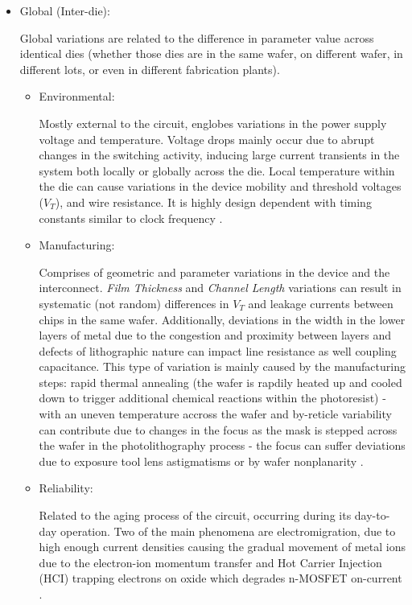 \documentclass[pgmicro,mestrado,english]{iiufrgs}
\begin{document}
\begin{itemize}

	\item Global (Inter-die):

	Global variations are related to the difference in parameter value across identical dies (whether those dies are in the same wafer, on different wafer, in different lots, or even in different fabrication plants).
		\begin{itemize}

		\item Environmental:

		Mostly external to the circuit, englobes variations in the power supply voltage and temperature. Voltage drops mainly occur due to abrupt changes in the switching activity, inducing large current transients in the system both locally or globally across the die. Local temperature within the die can cause variations in the device mobility and threshold voltages ($V_T$), and wire resistance. It is highly design dependent with timing constants similar to clock frequency \cite{nassif:08} \cite{bernstein2006high}.

		\item Manufacturing:

		Comprises of geometric and parameter variations in the device and the interconnect. \textit{Film Thickness} and \textit{Channel Length} variations can result in systematic (not random) differences in $V_T$ and leakage currents between chips in the same wafer. Additionally, deviations in the width in the lower layers of metal due to the congestion and proximity between layers and defects of lithographic nature can impact line resistance as well coupling capacitance. This type of variation is mainly caused by the manufacturing steps: rapid thermal annealing (the wafer is rapdily heated up and cooled down to trigger additional chemical reactions within the photoresist) - with an uneven temperature accross the wafer and by-reticle variability can contribute due to changes in the focus as the mask is stepped across the wafer in the photolithography process - the focus can suffer deviations due to exposure tool lens astigmatisms or by wafer nonplanarity \cite{bernstein2006high, qian2015variability}.

		\item Reliability:

		Related to the aging process of the circuit, occurring during its day-to-day operation. Two of the main phenomena are electromigration, due to high enough current densities causing the gradual movement of metal ions due to the electron-ion momentum transfer \cite{young1994failure} and Hot Carrier Injection (HCI) trapping electrons on oxide which degrades n-MOSFET on-current \cite{takeda1983empirical} \cite{nassif:08} \cite{bernstein2006high}.
		\end{itemize}


\end{itemize}
\end{document}
